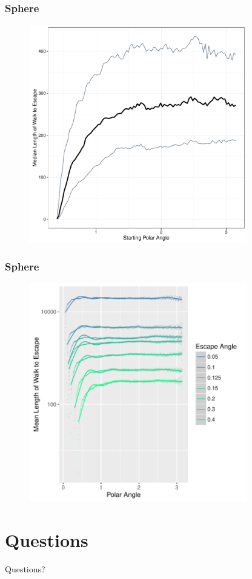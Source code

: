 \documentclass{beamer}
\begin{document}
\begin{frame}
	
	\frametitle{Sphere}
	
	\begin{figure}
		\includegraphics[width=0.85\textwidth]{images/ExampleSphereL04.pdf}
	\end{figure}
	
\end{frame}


\begin{frame}
	
	\frametitle{Sphere}
	
	\begin{figure}
		\includegraphics[width=0.85\textwidth]{images/SummaryPlot_L005_04.pdf}
	\end{figure}
	
\end{frame}

\section{Questions}

\begin{frame}
	
	\Huge{\centerline{Questions?}}
	
\end{frame}
\end{document}
